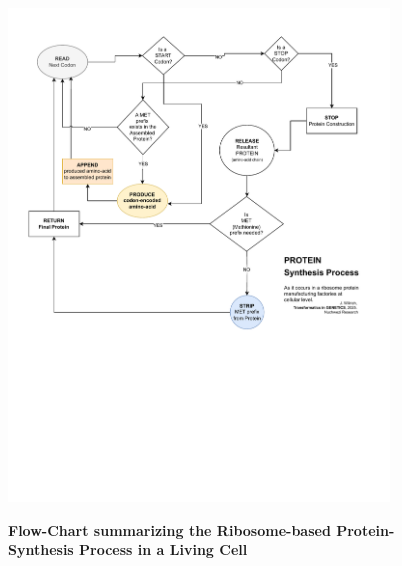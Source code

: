 \documentclass[a4paper, 18pt]{article} %
\begin{document}
\begin{figure}[H]
  \begin{center}
   \includegraphics[trim=0cm 8cm 0cm 0cm, clip, width=0.9\textwidth,]{resources/pdfs/ProteinSynthesisProcessFlowChart.pdf}\\
   \caption{\textbf{Flow-Chart summarizing the Ribosome-based Protein-Synthesis Process in a Living Cell}}
  \label{FIG3}
  \end{center}
\end{figure}
\end{document}
